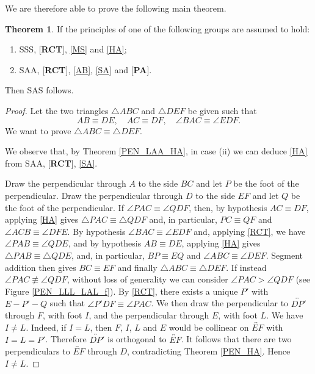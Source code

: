 \documentclass[11pt,a4paper]{article}
\theoremstyle{definition}
\newtheorem{thm}{Theorem}[section]
\theoremstyle{remark}
\numberwithin{equation}{section}
\begin{document}
We are therefore able to prove the following main theorem.
\begin{thm}\label{PEN_LLL_LAL}
If the principles of one of the following groups are assumed to hold:
\begin{enumerate}[label=(\roman*)]
\item SSS, [\textbf{RCT}], \ref{MS} and \ref{HA};
\item SAA, [\textbf{RCT}], \ref{AB}, \ref{SA} and [\textbf{PA}].
\end{enumerate}
Then SAS follows.
\end{thm}
\begin{proof}
Let the two triangles $\triangle ABC$ and $\triangle DEF$ be given such that
\begin{equation*}
AB \equiv DE,\quad AC\equiv DF,\quad\angle BAC\equiv\angle EDF.
\end{equation*}
We want to prove $\triangle ABC\equiv\triangle DEF$.

We observe that, by Theorem \ref{PEN_LAA_HA}, in case (ii) we can deduce \ref{HA} from SAA, [\textbf{RCT}], \ref{SA}.

Draw the perpendicular through $A$ to the side $BC$ and let $P$ be the foot of the perpendicular. Draw the perpendicular through $D$ to the side $EF$ and let $Q$ be the foot of the perpendicular. If $\angle PAC\equiv \angle QDF$, then, by hypothesis $AC\equiv DF$, applying \ref{HA} gives $\triangle PAC\equiv \triangle QDF$ and, in particular, $PC\equiv QF$ and $\angle ACB\equiv\angle DFE$. By hypothesis $\angle BAC\equiv\angle EDF$ and, applying \ref{RCT}, we have $\angle PAB\equiv \angle QDE$, and by hypothesis $AB\equiv DE$, applying \ref{HA} gives $\triangle PAB\equiv \triangle QDE$, and, in particular, $BP\equiv EQ$ and $\angle ABC\equiv\angle DEF$. Segment addition then gives $BC\equiv EF$ and finally $\triangle ABC\equiv\triangle DEF$. If instead $\angle PAC\not\equiv \angle QDF$, without loss of generality we can consider $\angle PAC >\angle QDF$ (see Figure \ref{PEN_LLL_LAL_f}). By \ref{RCT}, there exists a unique $P'$ with $E-P'-Q$ such that $\angle P'DF\equiv \angle PAC$. We then draw the perpendicular to $\overleftrightarrow{DP'}$ through $F$, with foot $I$, and the perpendicular through $E$, with foot $L$. We have $I\neq L$. Indeed, if $I=L$, then $F$, $I$, $L$ and $E$ would be collinear on $\overleftrightarrow{EF}$ with $I=L=P'$. Therefore $\overleftrightarrow{DP'}$ is orthogonal to $\overleftrightarrow{EF}$. It follows that there are two perpendiculars to $\overleftrightarrow{EF}$ through $D$, contradicting Theorem \ref{PEN_HA}. Hence $I\neq L$.


\end{proof}
\end{document}
